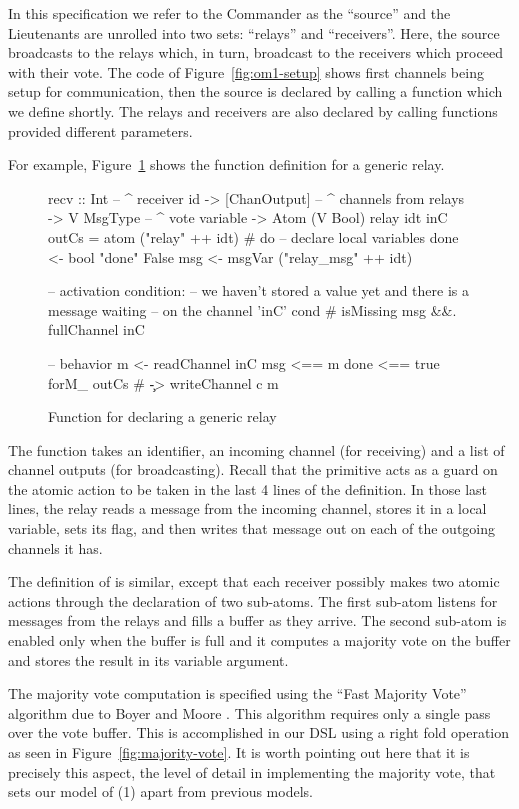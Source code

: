 In this specification we refer to the Commander as the ``source'' and the
Lieutenants are unrolled into two sets: ``relays'' and ``receivers''. Here,
the source broadcasts to the relays which, in turn, broadcast to the
receivers which proceed with their vote. The code of Figure~\ref{fig:om1-setup} shows first channels being setup for communication, then
the source is declared by calling a function which we define shortly. The
relays and receivers are also declared by calling functions provided different
parameters.

For example, Figure~\ref{fig:om1-relay} shows the function definition for a
generic relay.

\begin{figure}
\begin{lima}
recv :: Int           -- ^ receiver id
     -> [ChanOutput]  -- ^ channels from relays
     -> V MsgType     -- ^ vote variable
     -> Atom (V Bool)
relay idt inC outCs = atom ("relay" ++ idt) # do
  -- declare local variables
  done <- bool "done" False
  msg  <- msgVar ("relay_msg" ++ idt)

  -- activation condition:
  --   we haven't stored a value yet and there is a message waiting
  --   on the channel 'inC'
  cond # isMissing msg &&. fullChannel inC

  -- behavior
  m <- readChannel inC
  msg  <== m
  done <== true
  forM_ outCs # \c -> writeChannel c m
\end{lima}
\caption{Function for declaring a generic relay}
\label{fig:om1-relay}
\end{figure}

The  function takes an identifier, an incoming channel (for
receiving) and a list of channel outputs (for broadcasting). Recall that the
 primitive acts as a guard on the atomic action to be taken in the
last 4 lines of the definition. In those last lines, the relay reads a message
from the incoming channel, stores it in a local variable, sets its 
flag, and then writes that message out on each of the outgoing channels it has.

The definition of  is similar, except that each receiver possibly makes two
atomic actions through the declaration of two sub-atoms. The first sub-atom
listens for messages from the relays and fills a buffer as they arrive. The
second sub-atom is enabled only when the buffer is full and it computes a
majority vote on the buffer and stores the result in its  variable
argument.

The majority vote computation is specified using the ``Fast Majority Vote''
algorithm due to Boyer and Moore \cite{mjrty}. This algorithm requires only a
single pass over the vote buffer. This is accomplished in our DSL using a
right fold operation as seen in Figure~\ref{fig:majority-vote}. It is worth
pointing out here that it is precisely this aspect, the level of detail in
implementing the majority vote, that sets our model of \OM(1) apart from
previous models.

